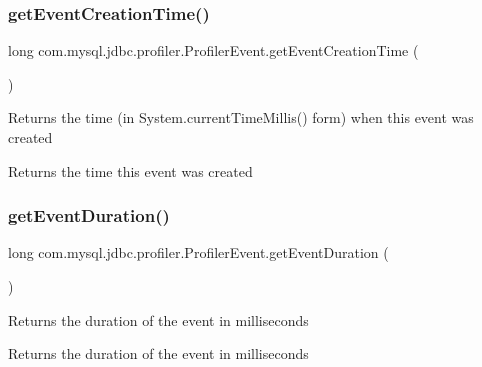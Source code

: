 \subsubsection{\texorpdfstring{get\+Event\+Creation\+Time()}{getEventCreationTime()}}
{\footnotesize\ttfamily long com.\+mysql.\+jdbc.\+profiler.\+Profiler\+Event.\+get\+Event\+Creation\+Time (\begin{DoxyParamCaption}{ }\end{DoxyParamCaption})}

Returns the time (in System.\+current\+Time\+Millis() form) when this event was created

\begin{DoxyReturn}{Returns}
the time this event was created 
\end{DoxyReturn}
\mbox{\label{classcom_1_1mysql_1_1jdbc_1_1profiler_1_1_profiler_event_ac84aed0bf6e19ad0e018fe0f1ebc00c6}} 
\subsubsection{\texorpdfstring{get\+Event\+Duration()}{getEventDuration()}}
{\footnotesize\ttfamily long com.\+mysql.\+jdbc.\+profiler.\+Profiler\+Event.\+get\+Event\+Duration (\begin{DoxyParamCaption}{ }\end{DoxyParamCaption})}

Returns the duration of the event in milliseconds

\begin{DoxyReturn}{Returns}
the duration of the event in milliseconds 
\end{DoxyReturn}
\mbox{\label{classcom_1_1mysql_1_1jdbc_1_1profiler_1_1_profiler_event_a4f980f077874e2c02ef0b871166c0f40}} 
